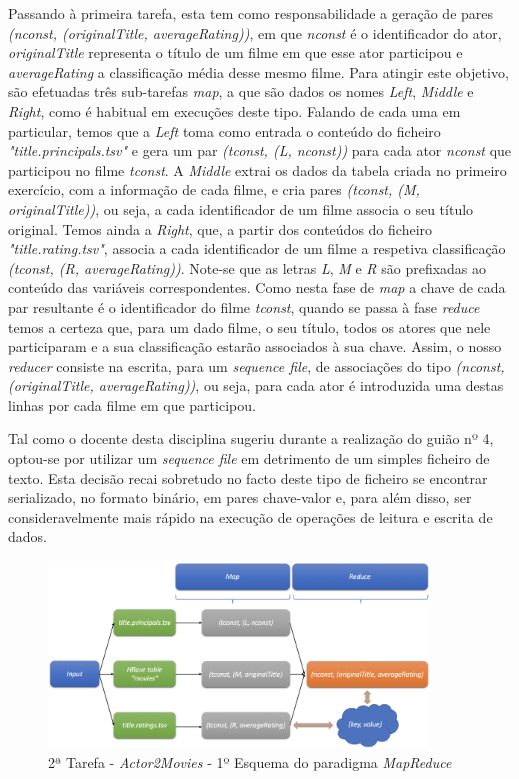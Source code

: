 \documentclass[a4paper]{report}
\begin{document}
{			Passando à primeira tarefa, esta tem como responsabilidade a geração de pares \textit{(nconst, (originalTitle, averageRating))}, em que \textit{nconst} é o identificador do ator, \textit{originalTitle} representa o título de um filme em que esse ator participou e \textit{averageRating} a classificação média desse mesmo filme.
			Para atingir este objetivo, são efetuadas três sub-tarefas \textit{map}, a que são dados os nomes \textit{Left}, \textit{Middle} e \textit{Right}, como é habitual em execuções deste tipo. Falando de cada uma em particular, temos que a \textit{Left} toma como entrada o conteúdo do ficheiro \textit{"title.principals.tsv"} e gera um par \textit{(tconst, (L, nconst))} para cada ator \textit{nconst} que participou no filme \textit{tconst}. A \textit{Middle} extrai os dados da tabela criada no primeiro exercício, com a informação de cada filme, e cria pares \textit{(tconst, (M, originalTitle))}, ou seja, a cada identificador de um filme associa o seu título original. Temos ainda a \textit{Right}, que, a partir dos conteúdos do ficheiro \textit{"title.rating.tsv"}, associa a cada identificador de um filme a respetiva classificação \textit{(tconst, (R, averageRating))}.
			Note-se que as letras \textit{L}, \textit{M} e \textit{R} são prefixadas ao conteúdo das variáveis correspondentes.
			Como nesta fase de \textit{map} a chave de cada par resultante é o identificador do filme \textit{tconst}, quando se passa à fase \textit{reduce} temos a certeza que, para um dado filme, o seu título, todos os atores que nele participaram e a sua classificação estarão associados à sua chave. Assim, o nosso \textit{reducer} consiste na escrita, para um \textit{sequence file}, de associações do tipo \textit{(nconst, (originalTitle, averageRating))}, ou seja, para cada ator é introduzida uma destas linhas por cada filme em que participou.

			Tal como o docente desta disciplina sugeriu durante a realização do guião nº 4, optou-se por utilizar um \textit{sequence file} em detrimento de um simples ficheiro de texto. Esta decisão recai sobretudo no facto deste tipo de ficheiro se encontrar serializado, no formato binário, em pares chave-valor e, para além disso, ser consideravelmente mais rápido na execução de operações de leitura e escrita de dados.
			\begin{figure}[H]
				\centering
				\includegraphics[width=0.9\textwidth]{Imagens/2ª Tarefa - Actor2Movies - 1º Esquema MapReduce.png}
				\caption{2ª Tarefa - \textit{Actor2Movies} - 1º Esquema do paradigma \textit{MapReduce}}
				\label{fig:19}
			\end{figure}

}
\end{document}

